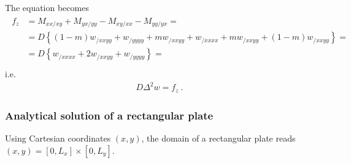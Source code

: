\documentclass[letterpaper,10pt,english]{jupyterBook}
\begin{document}
\sphinxAtStartPar
The equation becomes
\begin{equation*}
\begin{split}\begin{aligned}
  f_z 
  & =           M_{xx/xy} + M_{yx/yy} - M_{xy/xx} - M_{yy/yx}          = \\
  & = D \left\{ (1-m) w_{/xxyy} + w_{/yyyy} + m w_{/xxyy} + w_{/xxxx} + m w_{/xxyy} + ( 1 - m ) w_{/xxyy} \right\} = \\
  & = D \left\{  w_{/xxxx} + 2 w_{/xxyy} + w_{/yyyy} \right\} = \\
\end{aligned}\end{split}
\end{equation*}
\sphinxAtStartPar
i.e.
\begin{equation*}
\begin{split}D \Delta^2 w = f_z \ .\end{split}
\end{equation*}

\subsubsection{Analytical solution of a rectangular plate}
\label{\detokenize{ch/solids/plates-shells/kirchhoff:analytical-solution-of-a-rectangular-plate}}\label{\detokenize{ch/solids/plates-shells/kirchhoff:solid-mechanics-small-displacements-plates-shells-kirchhoff-pure-bending-analytical-sln}}
\sphinxAtStartPar
Using Cartesian coordinates \((x,y)\), the domain of a rectangular plate reads \((x,y) = [0,L_x] \times [0,L_y]\).
\end{document}
